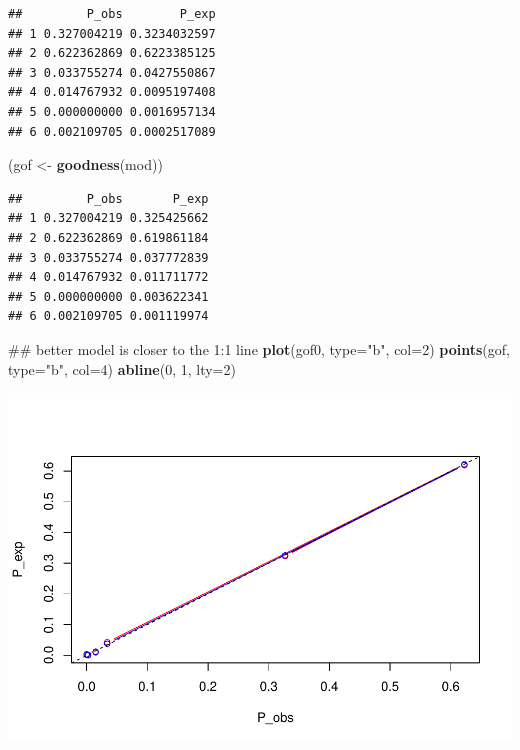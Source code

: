 \documentclass[]{article}
\newenvironment{Shaded}{\begin{snugshade}}{\end{snugshade}}
\newcommand{\KeywordTok}[1]{\textcolor[rgb]{0.13,0.29,0.53}{\textbf{#1}}}
\newcommand{\DataTypeTok}[1]{\textcolor[rgb]{0.13,0.29,0.53}{#1}}
\newcommand{\DecValTok}[1]{\textcolor[rgb]{0.00,0.00,0.81}{#1}}
\newcommand{\StringTok}[1]{\textcolor[rgb]{0.31,0.60,0.02}{#1}}
\newcommand{\NormalTok}[1]{#1}
\begin{document}
\begin{verbatim}
##         P_obs        P_exp
## 1 0.327004219 0.3234032597
## 2 0.622362869 0.6223385125
## 3 0.033755274 0.0427550867
## 4 0.014767932 0.0095197408
## 5 0.000000000 0.0016957134
## 6 0.002109705 0.0002517089
\end{verbatim}

\begin{Shaded}
\begin{Highlighting}[]
\NormalTok{(gof <-}\StringTok{ }\KeywordTok{goodness}\NormalTok{(mod))}
\end{Highlighting}
\end{Shaded}

\begin{verbatim}
##         P_obs       P_exp
## 1 0.327004219 0.325425662
## 2 0.622362869 0.619861184
## 3 0.033755274 0.037772839
## 4 0.014767932 0.011711772
## 5 0.000000000 0.003622341
## 6 0.002109705 0.001119974
\end{verbatim}

\begin{Shaded}
\begin{Highlighting}[]
\NormalTok{## better model is closer to the 1:1 line}
\KeywordTok{plot}\NormalTok{(gof0, }\DataTypeTok{type=}\StringTok{"b"}\NormalTok{, }\DataTypeTok{col=}\DecValTok{2}\NormalTok{)}
\KeywordTok{points}\NormalTok{(gof, }\DataTypeTok{type=}\StringTok{"b"}\NormalTok{, }\DataTypeTok{col=}\DecValTok{4}\NormalTok{)}
\KeywordTok{abline}\NormalTok{(}\DecValTok{0}\NormalTok{, }\DecValTok{1}\NormalTok{, }\DataTypeTok{lty=}\DecValTok{2}\NormalTok{)}
\end{Highlighting}
\end{Shaded}

\includegraphics{Patagonia_parrots_density_analysis_files/figure-latex/unnamed-chunk-43-1.pdf}
\end{document}
